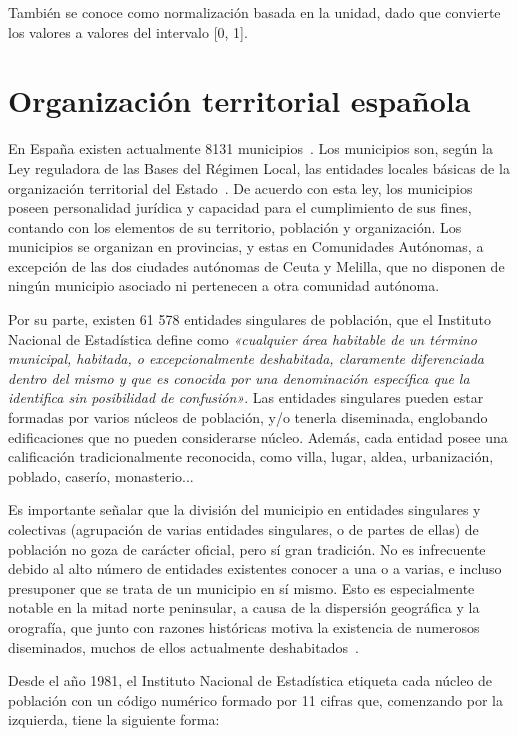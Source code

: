 También se conoce como normalización basada en la unidad, dado que convierte los valores a valores del intervalo [0, 1].

\section{Organización territorial española}

En España existen actualmente 8131 municipios~\cite{municipio}. Los municipios son, según la Ley reguladora de las Bases del Régimen Local, las entidades locales básicas de la organización territorial del Estado~\cite{ESP_wiki}. De acuerdo con esta ley, los municipios poseen personalidad jurídica y capacidad para el cumplimiento de sus fines, contando con los elementos de su territorio, población y organización. Los municipios se organizan en provincias, y estas en Comunidades Autónomas, a excepción de las dos ciudades autónomas de Ceuta y Melilla, que no disponen de ningún municipio asociado ni pertenecen a otra comunidad autónoma.

Por su parte, existen 61 578 entidades singulares de población, que el Instituto Nacional de Estadística define como \textit{«cualquier área habitable de un término municipal, habitada, o excepcionalmente deshabitada, claramente diferenciada dentro del mismo y que es conocida por una denominación específica que la identifica sin posibilidad de confusión»}. Las entidades singulares pueden estar formadas por varios núcleos de población, y/o tenerla diseminada, englobando edificaciones que no pueden considerarse núcleo. Además, cada entidad posee una calificación tradicionalmente reconocida, como villa, lugar, aldea, urbanización, poblado, caserío, monasterio...

Es importante señalar que la división del municipio en entidades singulares y colectivas (agrupación de varias entidades singulares, o de partes de ellas) de población no goza de carácter oficial, pero sí gran tradición. No es infrecuente debido al alto número de entidades existentes conocer a una o a varias, e incluso presuponer que se trata de un municipio en sí mismo. Esto es especialmente notable en la mitad norte peninsular, a causa de la dispersión geográfica y la orografía, que junto con razones históricas motiva la existencia de numerosos diseminados, muchos de ellos actualmente deshabitados~\cite{INE_entidad_singular}.

Desde el año 1981, el Instituto Nacional de Estadística etiqueta cada núcleo de población con un código numérico formado por 11 cifras que, comenzando por la izquierda, tiene la siguiente forma:

